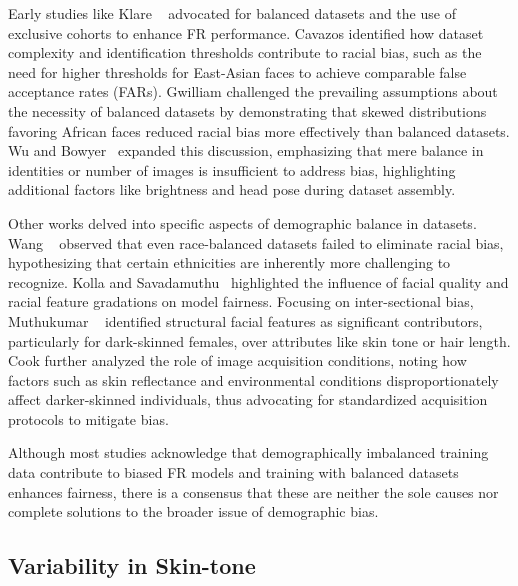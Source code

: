 Early studies like Klare \etal~\cite{klare2012face} advocated for balanced
datasets and the use of exclusive cohorts to enhance FR performance. Cavazos
\etal \cite{cavazos2020accuracy} identified how dataset complexity and
identification thresholds contribute to racial bias, such as the need for higher
thresholds for East-Asian faces to achieve comparable false acceptance rates
(FARs). Gwilliam \etal \cite{gwilliam2021rethinking} challenged the prevailing
assumptions about the necessity of balanced datasets by demonstrating that
skewed distributions favoring African faces reduced racial bias more effectively
than balanced datasets. Wu and Bowyer~\cite{wu2023should} expanded this
discussion, emphasizing that mere balance in identities or number of images is
insufficient to address bias, highlighting additional factors like brightness
and head pose during dataset assembly.

Other works delved into specific aspects of demographic balance in datasets.
Wang \etal~\cite{wang2019racial} observed that even race-balanced datasets
failed to eliminate racial bias, hypothesizing that certain ethnicities are
inherently more challenging to recognize. Kolla and
Savadamuthu~\cite{kolla2023impact} highlighted the influence of facial quality
and racial feature gradations on model fairness. Focusing on inter-sectional
bias, Muthukumar \etal~\cite{muthukumar2018understanding} identified structural
facial features as significant contributors, particularly for dark-skinned
females, over attributes like skin tone or hair length. Cook \etal
\cite{cook2019demographic} further analyzed the role of image acquisition
conditions, noting how factors such as skin reflectance and environmental
conditions disproportionately affect darker-skinned individuals, thus advocating
for standardized acquisition protocols to mitigate bias.

Although most studies acknowledge that demographically imbalanced training data
contribute to biased FR models and training with balanced datasets enhances
fairness, there is a consensus that these are neither the sole causes nor
complete solutions to the broader issue of demographic bias.

\subsection{Variability in Skin-tone}

